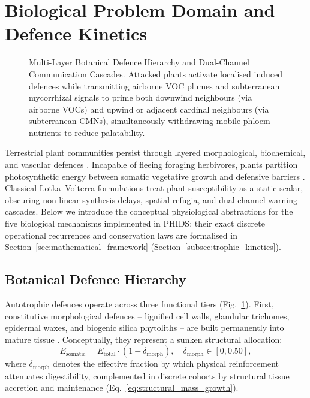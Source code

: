 
\section{Biological Problem Domain and Defence Kinetics}
\label{sec:biological_domain}

\begin{figure}[t]
  \centering
  
  \caption{Multi-Layer Botanical Defence Hierarchy and Dual-Channel Communication Cascades. Attacked plants activate localised induced defences while transmitting airborne VOC plumes and subterranean mycorrhizal signals to prime both downwind neighbours (via airborne VOCs) and upwind or adjacent cardinal neighbours (via subterranean CMNs), simultaneously withdrawing mobile phloem nutrients to reduce palatability.}
  \label{fig:botanical_defense_hierarchy}
\end{figure}

Terrestrial plant communities persist through layered morphological, biochemical, and vascular defences \cite{gatehouse2002plant}. Incapable of fleeing foraging herbivores, plants partition photosynthetic energy between somatic vegetative growth and defensive barriers \cite{charnov1976optimal, gatehouse2002plant}. Classical Lotka--Volterra formulations \cite{lotka1925elements, volterra1926fluctuations} treat plant susceptibility as a static scalar, obscuring non-linear synthesis delays, spatial refugia, and dual-channel warning cascades. Below we introduce the conceptual physiological abstractions for the five biological mechanisms implemented in PHIDS; their exact discrete operational recurrences and conservation laws are formalised in Section~\ref{sec:mathematical_framework} (Section~\ref{subsec:trophic_kinetics}).

\subsection{Botanical Defence Hierarchy}
\label{subsec:defense_hierarchy}

Autotrophic defences operate across three functional tiers (Fig.~\ref{fig:botanical_defense_hierarchy}). First, constitutive morphological defences -- lignified cell walls, glandular trichomes, epidermal waxes, and biogenic silica phytoliths -- are built permanently into mature tissue \cite{gatehouse2002plant}. Conceptually, they represent a sunken structural allocation:
\begin{equation}
  E_{\text{somatic}} = E_{\text{total}} \cdot (1 - \delta_{\text{morph}}), \quad \delta_{\text{morph}} \in [0, 0.50],
\end{equation}
where $\delta_{\text{morph}}$ denotes the effective fraction by which physical reinforcement attenuates digestibility, complemented in discrete cohorts by structural tissue accretion and maintenance (Eq.~\eqref{eq:structural_mass_growth}).

